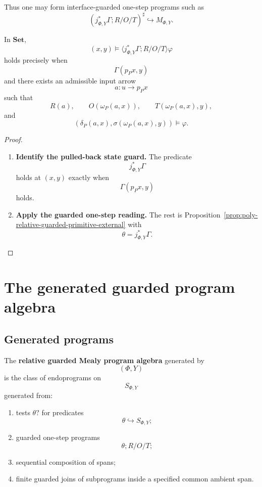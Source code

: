 Thus one may form interface-guarded one-step programs such as
\[
(j_{\Phi,Y}^\ast\Gamma;R/O/T)^\sharp
\hookrightarrow M_{\Phi,Y}.
\]

\begin{proposition}
\label{prop:poly-relative-interface-guard-external}
In \(\mathbf{Set}\),
\[
(x,y)\models
\langle j_{\Phi,Y}^\ast\Gamma;R/O/T\rangle\varphi
\]
holds precisely when
\[
\Gamma(p_Px,y)
\]
and there exists an admissible input arrow
\[
a:u\to p_Px
\]
such that
\[
R(a),
\qquad
O(\omega_P(a,x)),
\qquad
T(\omega_P(a,x),y),
\]
and
\[
\left(
\delta_P(a,x),
\sigma(\omega_P(a,x),y)
\right)
\models\varphi.
\]
\end{proposition}

\begin{proof}
\leavevmode
\begin{enumerate}
\item \textbf{Identify the pulled-back state guard.}
The predicate
\[
j_{\Phi,Y}^\ast\Gamma
\]
holds at \((x,y)\) exactly when
\[
\Gamma(p_Px,y)
\]
holds.

\item \textbf{Apply the guarded one-step reading.}
The rest is Proposition~\ref{prop:poly-relative-guarded-primitive-external}
with
\[
\theta=j_{\Phi,Y}^\ast\Gamma.
\]
\end{enumerate}
\end{proof}


\section{The generated guarded program algebra}
\label{sec:poly-relative-generated-program-algebra}

\subsection{Generated programs}
\label{subsec:poly-relative-generated-programs}

\begin{definition}
\label{def:poly-relative-guarded-program-algebra}
The \textbf{relative guarded Mealy program algebra} generated by
\[
(\Phi,Y)
\]
is the class of endoprograms on
\[
S_{\Phi,Y}
\]
generated from:
\begin{enumerate}
\item tests \(\theta?\) for predicates
\[
\theta\hookrightarrow S_{\Phi,Y};
\]
\item guarded one-step programs
\[
\theta;R/O/T;
\]
\item sequential composition of spans;
\item finite guarded joins of subprograms inside a specified common ambient
span.
\end{enumerate}
\end{definition}

